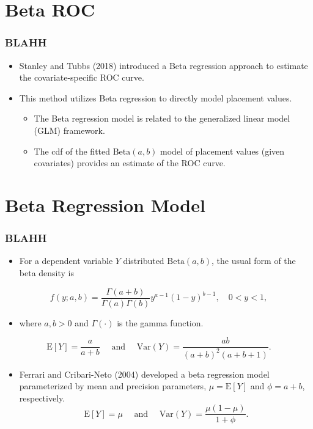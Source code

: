 \documentclass[t]{beamer}
\begin{document}
\section{Beta ROC}

\begin{frame}
	\frametitle{BLAHH}
	\begin{itemize}
		\item Stanley and Tubbs (2018) introduced a Beta regression approach to estimate the covariate-specific ROC curve.
		\item This method utilizes Beta regression to directly model placement values.
		\begin{itemize}
		    \item The Beta regression model is related to the generalized linear model (GLM) framework.
		    \item The cdf of the fitted $\text{Beta}(a, b)$ model of placement values (given covariates) provides an estimate of the ROC curve.
		\end{itemize}
	\end{itemize}
\end{frame}

\section{Beta Regression Model}

\begin{frame}
	\frametitle{BLAHH}
	\begin{itemize}
		\item For a dependent variable $Y$ distributed $\text{Beta}(a, b)$, the usual form of the beta density is 
	\end{itemize}
$$f(y; a, b) = \frac{\Gamma(a + b)}{\Gamma(a)\Gamma(b)}y^{a-1}(1 - y)^{b-1}, \quad 0 < y < 1,$$
\vspace{-.2in}
\begin{itemize}
	\item[] where $a, b > 0$ and $\Gamma(\cdot)$ is the gamma function.
\end{itemize}
$$\text{E}[Y] = \frac{a}{a+b} \quad \text{ and } \quad \text{Var}(Y) = \frac{ab}{(a + b)^2(a + b + 1)}.$$
\vspace{-.2in}
\begin{itemize}
	\item Ferrari and Cribari-Neto (2004) developed a beta regression model parameterized by mean and precision parameters, $\mu = \text{E}[Y]$ and $\phi = a + b$, respectively.
	$$\text{E}[Y] = \mu \quad \text{ and } \quad \text{Var}(Y) = \frac{\mu(1 - \mu)}{1 + \phi}.$$
\end{itemize}
\end{frame}
\end{document}
